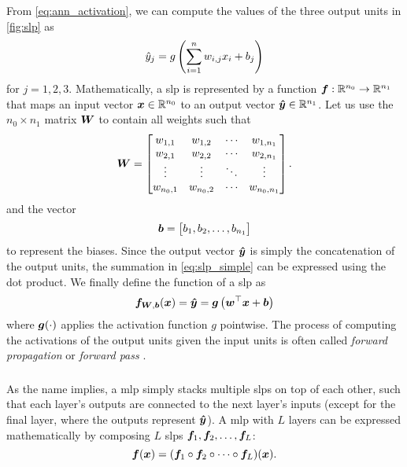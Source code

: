 \documentclass[../main.tex]{subfiles}
\begin{document}
From \cref{eq:ann_activation}, we can compute the values of the three output units in \cref{fig:slp} as
\begin{equation}
    \label{eq:slp_simple}
    \hat{y}_j = g\left(\sum_{i=1}^n{w_{i,j} x_i} + b_j\right)
\end{equation}
for $j=1,2,3$.
Mathematically, a \gls{slp} is represented by a function ${\bm{f}}:\mathbb{R}^{n_0}\to \mathbb{R}^{n_1}$ that maps an input vector ${\bm{x}} \in \mathbb{R}^{n_0}$ to an output vector ${\bm{\hat{y}}} \in \mathbb{R}^{n_1}$.
Let us use the $n_0 \times n_1$ matrix ${\bm{W}}$ to contain all weights such that
\begin{equation*}
    {\bm{W}} = \begin{bmatrix}
        w_{1,1} & w_{1,2} & \cdots & w_{1,n_1} \\ 
        w_{2,1} & w_{2,2} & \cdots & w_{2,n_1} \\ 
        \vdots & \vdots & \ddots & \vdots \\ 
        w_{n_0,1} & w_{n_0,2} & \cdots & w_{n_0,n_1} \\ 
    \end{bmatrix}.
\end{equation*}
and the vector
\begin{equation*}
    {\bm{b}} = \begin{bmatrix}
        b_1,b_2,\dots,b_{n_1}
    \end{bmatrix}
\end{equation*}
to represent the biases.
Since the output vector ${\bm{\hat{y}}}$ is simply the concatenation of the output units, the summation in \cref{eq:slp_simple} can be expressed using the dot product. We finally define the function of a \gls{slp} as
\begin{equation}
    \label{eq:slp}
    {\bm{f}}_{{\bm{W}},{\bm{b}}}({\bm{x}}) = {\bm{\hat{y}}} = {\bm{g}}\left(
        {\bm{w}}^\top {\bm{x}} + {\bm{b}}
    \right)
\end{equation}
where ${\bm{g}}(\cdot)$ applies the activation function $g$ pointwise.
The process of computing the activations of the output units given the input units is often called \emph{forward propagation} or \emph{forward pass} \cite{burkov2019}.

\subsubsection{}
As the name implies, a \gls{mlp} simply stacks multiple \glspl{slp} on top of each other, such that each layer's outputs are connected to the next layer's inputs (except for the final layer, where the outputs represent ${\bm{\hat{y}}}$).
A \gls{mlp} with $L$ layers can be expressed mathematically by composing $L$ \glspl{slp} ${\bm{f}}_1,{\bm{f}}_2,\dots,{\bm{f}}_L$:
\begin{equation}
    \label{eq:mlp}
    {\bm{f}}({\bm{x}}) = ({\bm{f}}_1 \circ {\bm{f}}_2 \circ \dots \circ {\bm{f}}_L)({\bm{x}}).
\end{equation}
\end{document}
